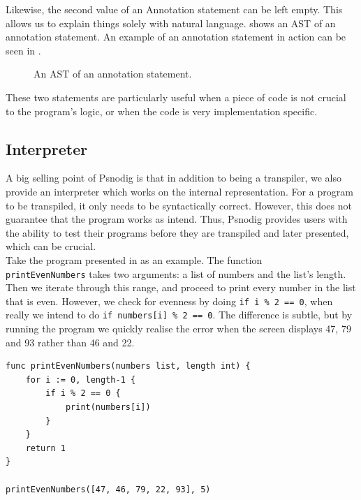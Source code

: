 Likewise, the second value of an Annotation statement can be left empty. This allows us to explain things solely with natural language.  shows an AST of an annotation statement. An example of an annotation statement in action can be seen in . \\

\begin{figure}[ht!]
    \caption{An AST of an annotation statement.}
    \label{An AST of an annotation statement.}
\end{figure}

These two statements are particularly useful when a piece of code is not crucial to the program's logic, or when the code is very implementation specific.

\subsection{Interpreter}

A big selling point of Psnodig is that in addition to being a transpiler, we also provide an interpreter which works on the internal representation. For a program to be transpiled, it only needs to be syntactically correct. However, this does not guarantee that the program works as intend. Thus, Psnodig provides users with the ability to test their programs before they are transpiled and later presented, which can be crucial. \\

Take the program presented in  as an example. The function \\ \texttt{printEvenNumbers} takes two arguments: a list of numbers and the list's length. Then we iterate through this range, and proceed to print every number in the list that is even. However, we check for evenness by doing \texttt{if i \% 2 == 0}, when really we intend to do \texttt{if numbers[i] \% 2 == 0}. The difference is subtle, but by running the program we quickly realise the error when the screen displays 47, 79 and 93 rather than 46 and 22. \\

\begin{lstlisting}[caption={A syntactically correct Gourmet program with a subtle logical error.}, captionpos=b, label={A syntactically correct program with a subtle logical error.}]
func printEvenNumbers(numbers list, length int) {
    for i := 0, length-1 {
        if i % 2 == 0 {
            print(numbers[i])
        }
    }
    return 1
}

printEvenNumbers([47, 46, 79, 22, 93], 5)
\end{lstlisting}

